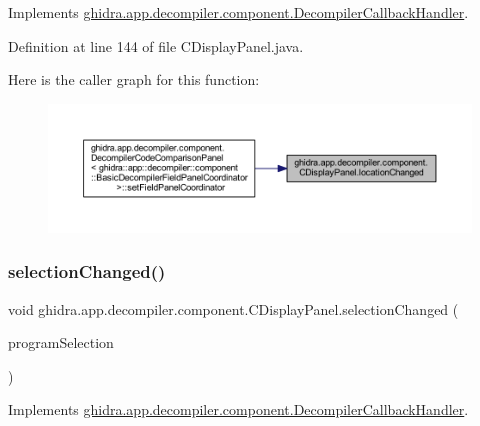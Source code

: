 Implements \mbox{\hyperlink{interfaceghidra_1_1app_1_1decompiler_1_1component_1_1_decompiler_callback_handler_aca06fb5e7e930f4b89195dbdf60d95c3}{ghidra.\+app.\+decompiler.\+component.\+Decompiler\+Callback\+Handler}}.



Definition at line 144 of file C\+Display\+Panel.\+java.

Here is the caller graph for this function\+:
\nopagebreak
\begin{figure}[H]
\begin{center}
\leavevmode
\includegraphics[width=350pt]{classghidra_1_1app_1_1decompiler_1_1component_1_1_c_display_panel_a7f57fbf9d9615e6d475813776462beac_icgraph}
\end{center}
\end{figure}
\mbox{\label{classghidra_1_1app_1_1decompiler_1_1component_1_1_c_display_panel_ad50cdae31ae05e417f812e5855f33d2f}} 
\subsubsection{\texorpdfstring{selectionChanged()}{selectionChanged()}}
{\footnotesize\ttfamily void ghidra.\+app.\+decompiler.\+component.\+C\+Display\+Panel.\+selection\+Changed (\begin{DoxyParamCaption}\item[{Program\+Selection}]{program\+Selection }\end{DoxyParamCaption})\hspace{0.3cm}{\ttfamily [inline]}}



Implements \mbox{\hyperlink{interfaceghidra_1_1app_1_1decompiler_1_1component_1_1_decompiler_callback_handler_a9dc1e47dfe1bdecaa25b5db9d06cd1d7}{ghidra.\+app.\+decompiler.\+component.\+Decompiler\+Callback\+Handler}}.



